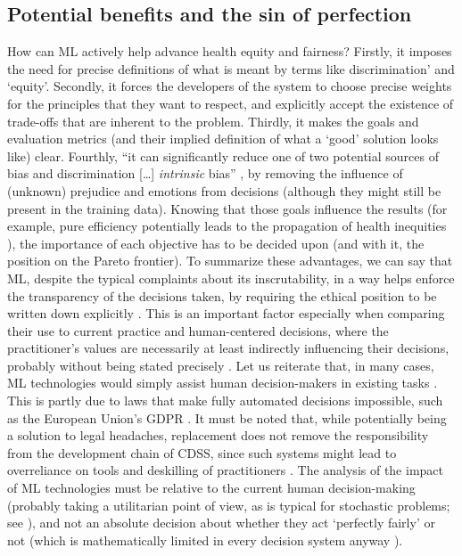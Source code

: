 \subsection{Potential benefits and the sin of perfection}
    How can ML actively help advance health equity and fairness?
    Firstly, it imposes the need for precise definitions of what is meant by terms like discrimination' and `equity'.
    Secondly, it forces the developers of the system to choose precise weights for the principles that they want to respect, and explicitly accept the existence of trade-offs that are inherent to the problem.
    Thirdly, it makes the goals and evaluation metrics (and their implied definition of what a `good' solution looks like) clear.
    Fourthly, ``it can significantly reduce one of two potential sources of bias and discrimination [\dots] \emph{intrinsic} bias'' \cite[p.~672]{Zerilli2019}, by removing the influence of (unknown) prejudice and emotions from decisions (although they might still be present in the training data).
    Knowing that those goals influence the results \cite{Dijkstra2020} (for example, pure efficiency potentially leads to the propagation of health inequities \cite{Rajkomar2018}), the importance of each objective has to be decided upon (and with it, the position on the Pareto frontier).
    To summarize these advantages, we can say that ML, despite the typical complaints about its inscrutability, in a way helps enforce the transparency of the decisions taken, by requiring the ethical position to be written down explicitly \cite{Williamson2021}.
    This is an important factor especially when comparing their use to current practice and human-centered decisions, where the practitioner's values are necessarily at least indirectly influencing their decisions, probably without being stated precisely \cite{Zerilli2019}.
    Let us reiterate that, in many cases, ML technologies would simply assist human decision-makers in existing tasks \cite{Morley2020}.
    This is partly due to laws that make fully automated decisions impossible, such as the European Union's GDPR \cite{Zerilli2019}.
    It must be noted that, while potentially being a solution to legal headaches, replacement does not remove the responsibility from the development chain of CDSS, since such systems might lead to overreliance on tools and deskilling of practitioners \cite{Morley2020}.
    The analysis of the impact of ML technologies must be relative to the current human decision-making (probably taking a utilitarian point of view, as is typical for stochastic problems; see \cite{Hardin1989}), and not an absolute decision about whether they act `perfectly fairly' or not (which is mathematically limited in every decision system anyway \cite{Zerilli2019}).
